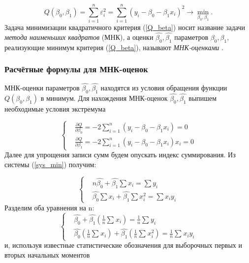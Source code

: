 \documentclass[../body.tex]{subfiles}
\begin{document}
	\begin{equation}
		Q(\beta_{0}, \beta_{1}) = \sum_{i=1}^{n}{\varepsilon_{i}^{2}} = 
		\sum_{i=1}^{n}{(y_{i} - \beta_{0} - \beta_{1}x_{i})^{2}}\rightarrow \min_{\beta_{0}, \beta_{1}}.
		\label{Q_beta}
	\end{equation}
	Задача минимизации квадратичного критерия (\ref{Q_beta}) носит название задачи \textit{метода наименьших квадратов} (МНК), а оценки $\widehat{\beta_{0}}, \widehat{\beta_{1}}$ параметров $\beta_{0}, \beta_{1}$, реализующие минимум критерия (\ref{Q_beta}), называют \textit{МНК-оценками} \cite[c.~508]{max}. 
	
	\subsubsection{Расчётные формулы для МНК-оценок}
	МНК-оценки параметров $\widehat{\beta_{0}}, \widehat{\beta_{1}}$ находятся из условия обращения функции $Q(\beta_{0}, \beta_{1})$ в минимум. 
	\newline
	Для нахождения МНК-оценок $\widehat{\beta_{0}}, \widehat{\beta_{1}}$ выпишем необходимые условия экстремума
	
	\begin{equation}
		\begin{cases}
			& \frac{\partial Q}{\partial \beta_{0}}  = 
			-2\sum_{i=1}^{n}{(y_{i} - \beta_{0} - \beta_{1}x_{i})} = 0\\ 
			
			& \frac{\partial Q}{\partial \beta_{1}}  = 
			-2\sum_{i=1}^{n}{(y_{i} - \beta_{0} - \beta_{1}x_{i})x_{i}} = 0 
		\end{cases}
	\label{sys_min}
	\end{equation}
	Далее для упрощения записи сумм будем опускать индекс суммирования. Из системы (\ref{sys_min}) получим:
	
	\begin{equation}
		\begin{cases}
			& n\widehat{\beta_{0}} + \widehat{\beta_{1}}\sum{x_{i}} = \sum{y_{i}}\\ 
			& \widehat{\beta_{0}}\sum{x_{i}} + \widehat{\beta_{1}}\sum{x_{i}^{2}} = \sum{x_{i}y_{i}}
		\end{cases}
	\end{equation}
	Разделим оба уравнения на n:
	\begin{equation}
		\begin{cases}
			& \widehat{\beta_{0}} + \widehat{\beta_{1}}(\frac{1}{n}\sum_{}{}{x_{i}}) = 
			\frac{1}{n}\sum_{}{}{y_{i}}\\ 
			
			& \widehat{\beta_{0}}(\frac{1}{n}\sum_{}{}{x_{i}}) + \widehat{\beta_{1}}(\frac{1}{n}\sum_{}{}{x_{i}^{2}}) = \frac{1}{n}\sum_{}{}{x_{i}y_{i}}
		\end{cases}
		\label{sys_3}
	\end{equation}
	и, используя известные статистические обозначения для выборочных первых и вторых начальных моментов
	
\end{document}
